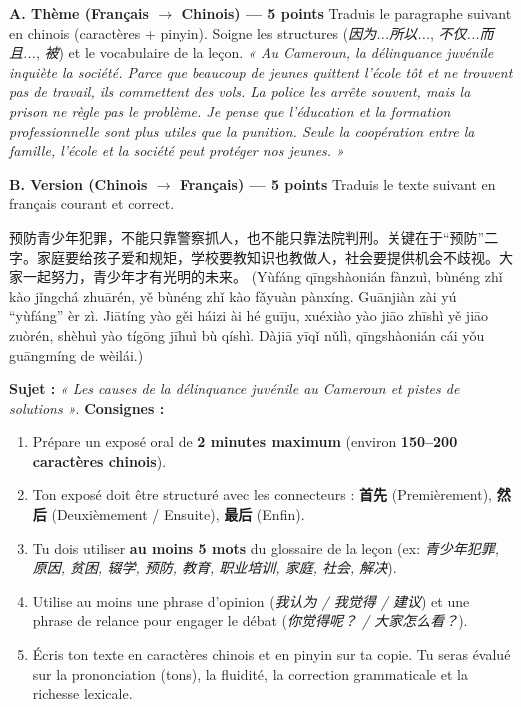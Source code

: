 \documentclass[11pt]{article}
\begin{document}
\begin{exercice}
\textbf{A. Thème (Français $\rightarrow$ Chinois) — 5 points}
Traduis le paragraphe suivant en chinois (caractères + pinyin). Soigne les structures (\emph{因为...所以...}, \emph{不仅...而且...}, \emph{被}) et le vocabulaire de la leçon.
\emph{« Au Cameroun, la délinquance juvénile inquiète la société. Parce que beaucoup de jeunes quittent l'école tôt et ne trouvent pas de travail, ils commettent des vols. La police les arrête souvent, mais la prison ne règle pas le problème. Je pense que l'éducation et la formation professionnelle sont plus utiles que la punition. Seule la coopération entre la famille, l'école et la société peut protéger nos jeunes. »}

\textbf{B. Version (Chinois $\rightarrow$ Français) — 5 points}
Traduis le texte suivant en français courant et correct.
\begin{textebox}
预防青少年犯罪，不能只靠警察抓人，也不能只靠法院判刑。关键在于“预防”二字。家庭要给孩子爱和规矩，学校要教知识也教做人，社会要提供机会不歧视。大家一起努力，青少年才有光明的未来。
(Yùfáng qīngshàonián fànzuì, bùnéng zhǐ kào jǐngchá zhuārén, yě bùnéng zhǐ kào fǎyuàn pànxíng. Guānjiàn zài yú “yùfáng” èr zì. Jiātíng yào gěi háizi ài hé guīju, xuéxiào yào jiāo zhīshì yě jiāo zuòrén, shèhuì yào tígōng jīhuì bù qíshì. Dàjiā yīqǐ nǔlì, qīngshàonián cái yǒu guāngmíng de wèilái.)
\end{textebox}
\end{exercice}

\begin{exercice}
\textbf{Sujet :} \emph{« Les causes de la délinquance juvénile au Cameroun et pistes de solutions »}.
\textbf{Consignes :}
\begin{enumerate}
    \item Prépare un exposé oral de \textbf{2 minutes maximum} (environ \textbf{150--200 caractères chinois}).
    \item Ton exposé doit être structuré avec les connecteurs : \textbf{首先} (Premièrement), \textbf{然后} (Deuxièmement / Ensuite), \textbf{最后} (Enfin).
    \item Tu dois utiliser \textbf{au moins 5 mots} du glossaire de la leçon (ex: \emph{青少年犯罪, 原因, 贫困, 辍学, 预防, 教育, 职业培训, 家庭, 社会, 解决}).
    \item Utilise au moins une phrase d'opinion (\emph{我认为 / 我觉得 / 建议}) et une phrase de relance pour engager le débat (\emph{你觉得呢？ / 大家怎么看？}).
    \item Écris ton texte en caractères chinois et en pinyin sur ta copie. Tu seras évalué sur la prononciation (tons), la fluidité, la correction grammaticale et la richesse lexicale.
\end{enumerate}
\end{exercice}
\end{document}
